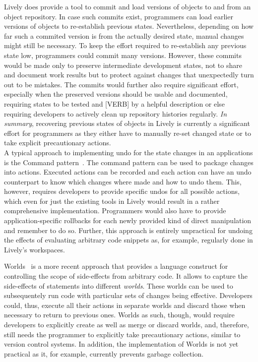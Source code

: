 Lively does provide a tool to commit and load versions of objects to and from an object repository.
In case such commits exist, programmers can load earlier versions of objects to re-establish previous states.
Nevertheless, depending on how far such a commited version is from the actually desired state, manual changes might still be necessary.
To keep the effort required to re-establish any previous state low, programmers could commit many versions.
However, these commits would be made only to preserve intermediate development states, not to share and document work results but to protect against changes that unexpectedly turn out to be mistakes.
The commits would further also require significant effort, especially when the preserved versions should be usable and documented, requiring states to be tested and [VERB] by a helpful description or else requiring developers to actively clean up repository histories regularly.
\emph{In summary}, recovering previous states of objects in Lively is currently a significant effort for programmers as they either have to manually re-set changed state or to take explicit precautionary actions.\\

A typical approach to implementing undo for the state changes in an applications is the Command pattern~\cite{GammaHelmJohnsonVlissides95}.
The command pattern can be used to package changes into actions.
Executed actions can be recorded and each action can have an undo counterpart to know which changes where made and how to undo them.
This, however, requires developers to provide specific undos for all possible actions, which even for just the existing tools in Lively would result in a rather comprehensive implementation.
Programmers would also have to provide application-specific rollbacks for each newly provided kind of direct manipulation and remember to do so.
Further, this approach is entirely unpractical for undoing the effects of evaluating arbitrary code snippets as, for example, regularly done in Lively's workspaces.

Worlds~\cite{Warth2011Wor} is a more recent approach that provides a language construct for controlling the scope of side-effects from arbitrary code.
It allows to capture the side-effects of statements into different \emph{worlds}.
These worlds can be used to subsequentely run code with particular sets of changes being effective.
Developers could, thus, execute all their actions in separate worlds and discard those when necessary to return to previous ones.
Worlds as such, though, would require developers to explicitly create as well as merge or discard worlds, and, therefore, still needs the programmer to explicitly take precautionary actions, similar to version control systems.
In addition, the implementation of Worlds is not yet practical as it, for example, currently prevents garbage collection.\\

